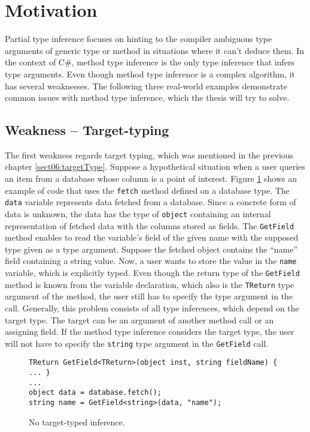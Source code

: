 \section{Motivation} \label{sect10:mot}

Partial type inference focuses on hinting to the compiler ambiguous type arguments of generic type or method in situations where it can’t deduce them. 
In the context of C\#, method type inference is the only type inference that infers type arguments. 
Even though method type inference is a complex algorithm, it has several weaknesses. 
The following three real-world examples demonstrate common issues with method type inference, which the thesis will try to solve.

\subsection{Weakness -- Target-typing}
The first weakness regards target typing, which was mentioned in the previous chapter \ref{sect06:targetType}. 
Suppose a hypothetical situation when a user queries an item from a database whose column is a point of interest. 
Figure \ref{img27:usecase1} shows an example of code that uses the \texttt{fetch} method defined on a database type. 
The \texttt{data} variable represents data fetched from a database. 
Since a concrete form of data is unknown, the data has the type of \texttt{object} containing an internal representation of fetched data with the columns stored as fields. 
The \texttt{GetField} method enables to read the variable’s field of the given name with the supposed type given as a type argument. 
Suppose the fetched object contains the ``name'' field containing a string value. 
Now, a user wants to store the value in the \texttt{name} variable, which is explicitly typed. 
Even though the return type of the \texttt{GetField} method is known from the variable declaration, which also is the \texttt{TReturn} type argument of the method, the user still has to specify the type argument in the call. 
Generally, this problem consists of all type inferences, which depend on the target type. The target can be an argument of another method call or an assigning field. 
If the method type inference considers the target type, the user will not have to specify the \texttt{string} type argument in the \texttt{GetField} call.
\begin{figure}[h]
\begin{lstlisting}[style=csharp]
TReturn GetField<TReturn>(object inst, string fieldName) { ... }
...
object data = database.fetch();
string name = GetField<string>(data, "name");
\end{lstlisting}
\caption{No target-typed inference.}
\label{img27:usecase1}
\end{figure}

